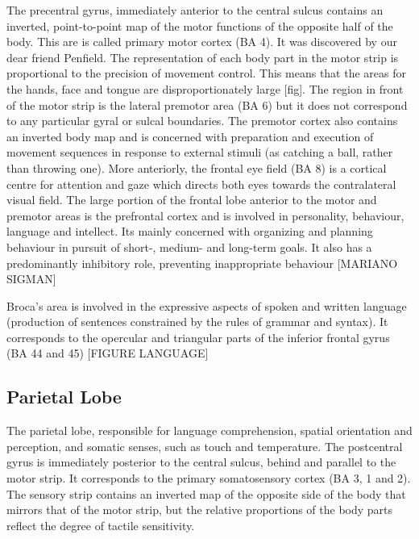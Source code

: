 The precentral gyrus, immediately anterior to the central sulcus contains an inverted, point-to-point map of the motor functions of the opposite half of the body.
This are is called primary motor cortex (BA 4).
It was discovered by our dear friend Penfield.
The representation of each body part in the motor strip is proportional to the precision of movement control. This means that the areas for the hands, face and tongue are disproportionately large [fig].
The region in front of the motor strip is the lateral premotor area (BA 6) but it does not correspond to any particular gyral or sulcal boundaries.
The premotor cortex also contains an inverted body map and is concerned with preparation and execution of movement sequences in response to external stimuli (as catching a ball, rather than throwing one).
More anteriorly, the frontal eye field (BA 8) is a cortical centre for attention and gaze which directs both eyes towards the contralateral visual field.
The large portion of the frontal lobe anterior to the motor and premotor areas is the prefrontal cortex and is involved in personality, behaviour, language and intellect.
Its mainly concerned with organizing and planning behaviour in pursuit of short-, medium- and long-term goals.
It also has a predominantly inhibitory role, preventing inappropriate behaviour [MARIANO SIGMAN]

Broca’s area is involved in the expressive aspects of spoken and written language (production of sentences constrained by the rules of grammar and syntax). 
It corresponds to the opercular and triangular parts of the inferior frontal gyrus (BA 44 and 45) [FIGURE LANGUAGE]


\subsection{Parietal Lobe}
The parietal lobe, responsible for language comprehension, spatial orientation and perception, and somatic senses, such as touch and temperature.
The postcentral gyrus is immediately posterior to the central sulcus, behind and parallel to the motor strip.
It corresponds to the primary somatosensory cortex (BA 3, 1 and 2).
The sensory strip contains an inverted map of the opposite side of the body that mirrors that of the motor strip, but the relative proportions of the body parts reflect the degree of tactile sensitivity.


